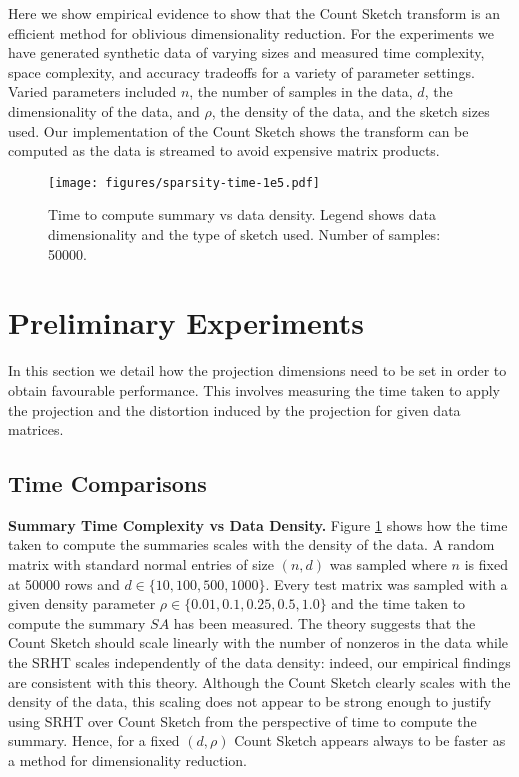
Here we show empirical evidence to show that the Count Sketch transform is
an efficient method for oblivious dimensionality reduction.
For the experiments we have generated synthetic data of varying sizes and measured
time complexity, space complexity, and accuracy tradeoffs for a variety of parameter
settings.
Varied parameters included $n$, the number of samples in the data, $d$, the
dimensionality of the data, and $\rho$, the density of the data, and the sketch
sizes used.
Our implementation of the Count Sketch shows the transform
can be computed as the data is streamed to avoid expensive matrix products.

\begin{figure}
  \texttt{[image: figures/sparsity-time-1e5.pdf]}
  \caption{Time to compute summary vs data density. Legend shows data dimensionality
          and the type of sketch used.  Number of samples: 50000.}
  \label{fig: summary-time-vs-density}
\end{figure}

\section{Preliminary Experiments}
In this section we detail how the projection dimensions need to be set in order
to obtain favourable performance.
This involves measuring the time taken to apply the projection and the distortion
induced by the projection for given data matrices.


\subsection{Time Comparisons}

\noindent
\textbf{Summary Time Complexity vs Data Density.}
Figure \ref{fig: summary-time-vs-density} shows how the time taken to compute the
summaries scales with the density of the data.
A random matrix with standard normal entries of size $(n,d)$ was sampled where $n$ is fixed
at 50000 rows and $d \in \{10, 100, 500, 1000\}$.
Every test matrix was sampled with a given density parameter $\rho \in \{ 0.01,
0.1, 0.25, 0.5, 1.0 \}$ and the time taken to compute the summary $SA$ has been
measured.
The theory suggests that the Count Sketch should scale linearly with the number
of nonzeros in the data while the SRHT scales independently of the data density:
indeed, our empirical findings are consistent with this theory.
Although the Count Sketch clearly scales with the density of the data, this scaling
does not appear to be strong enough to justify using SRHT over Count Sketch from
the perspective of time to compute the summary.
Hence, for a fixed $(d, \rho)$ Count Sketch appears always to be faster as a
method for dimensionality reduction.

